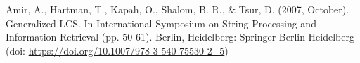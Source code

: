 \documentclass[]{article}
\begin{document}




\begin{thebibliography}{9}
	Amir, A., Hartman, T., Kapah, O., Shalom, B. R., \& Tsur, D. (2007, October). Generalized {LCS}. In International Symposium on String Processing and Information Retrieval (pp. 50-61). Berlin, Heidelberg: Springer Berlin Heidelberg (doi:  \url{https://doi.org/10.1007/978-3-540-75530-2_5})
	
 
\end{thebibliography}
\end{document}
